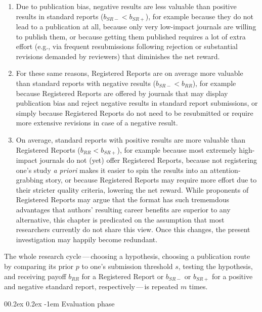\documentclass[british,,doc,mask,floatsintext]{apa6}
\makeatletter
\providecommand{\tightlist}{%
  \setlength{\itemsep}{0pt}\setlength{\parskip}{0pt}}
\renewcommand{\paragraph}{\@startsection{paragraph}{4}{\parindent}%
  {0\baselineskip \@plus 0.2ex \@minus 0.2ex}%
  {-1em}%
  {\normalfont\normalsize\bfseries\itshape\typesectitle}}
\makeatother
\begin{document}
\begin{enumerate}
\def\labelenumi{\arabic{enumi}.}
\tightlist
\item
  Due to publication bias, negative results are less valuable than positive results in standard reports (\(b_{SR-} < b_{SR+}\)), for example because they do not lead to a publication at all, because only very low-impact journals are willing to publish them, or because getting them published requires a lot of extra effort (e.g., via frequent resubmissions following rejection or substantial revisions demanded by reviewers) that diminishes the net reward.
\item
  For these same reasons, Registered Reports are on average more valuable than standard reports with negative results (\(b_{SR-} < b_{RR}\)), for example because Registered Reports are offered by journals that may display publication bias and reject negative results in standard report submissions, or simply because Registered Reports do not need to be resubmitted or require more extensive revisions in case of a negative result.
\item
  On average, standard reports with positive results are more valuable than Registered Reports (\(b_{RR} < b_{SR+}\)), for example because most extremely high-impact journals do not (yet) offer Registered Reports, because not registering one's study \emph{a priori} makes it easier to spin the results into an attention-grabbing story, or because Registered Reports may require more effort due to their stricter quality criteria, lowering the net reward.
  While proponents of Registered Reports may argue that the format has such trememdous advantages that authors' resulting career benefits are superior to any alternative, this chapter is predicated on the assumption that most researchers currently do not share this view.
  Once this changes, the present investigation may happily become redundant.
\end{enumerate}

The whole research cycle\(\,\)---\(\,\)choosing a hypothesis, choosing a publication route by comparing its prior \(p\) to one's submission threshold \(s\), testing the hypothesis, and receiving payoff \(b_{RR}\) for a Registered Report or \(b_{SR-}\) or \(b_{SR+}\) for a positive and negative standard report, respectively\(\,\)---\(\,\)is repeated \(m\) times.

\hypertarget{evaluation-phase}{%
\paragraph{Evaluation phase}\label{evaluation-phase}}
\end{document}
